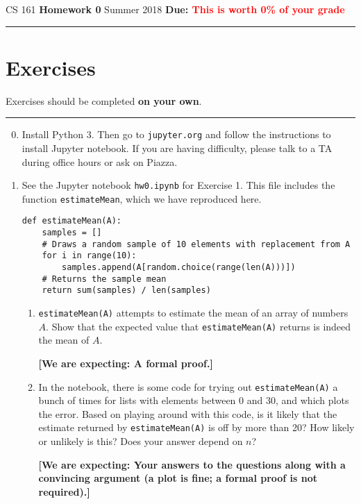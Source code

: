 \documentclass{article}
\begin{document}
\noindent
CS 161 \hfill \textbf{Homework 0} \newline 
Summer 2018 \hfill \textbf{Due: \textcolor{red}{This is worth 0\% of your grade}}

\noindent
\rule{\linewidth}{0.4pt}

\section*{Exercises}

Exercises should be completed \textbf{on your own}.

\noindent\rule{\linewidth}{1.0pt}

\begin{enumerate}
  \setcounter{enumi}{-1}
  \item Install Python 3. Then go to \texttt{jupyter.org} and follow the
    instructions to install Jupyter notebook. If you are having difficulty,
    please talk to a TA during office hours or ask on Piazza.
  \item See the Jupyter notebook \texttt{hw0.ipynb} for Exercise 1. This file
    includes the function \texttt{estimateMean}, which we have reproduced here.

\begin{verbatim}
def estimateMean(A):
    samples = []
    # Draws a random sample of 10 elements with replacement from A
    for i in range(10):
        samples.append(A[random.choice(range(len(A)))])
    # Returns the sample mean
    return sum(samples) / len(samples)
\end{verbatim}

    \begin{enumerate}
      \item \texttt{estimateMean(A)} attempts to estimate the mean of an array of numbers $A$. Show
        that the expected value that \texttt{estimateMean(A)} returns is indeed
        the mean of $A$.

        \textbf{[We are expecting: A formal proof.]}
      \item In the notebook, there is some code for trying out 
        \texttt{estimateMean(A)} a bunch of times for lists with elements
        between 0 and 30, and which plots the error. Based on playing around
        with this code, is it likely that the estimate returned by 
        \texttt{estimateMean(A)} is off by more than 20? How likely or unlikely
        is this? Does your answer depend on $n$?

        \textbf{[We are expecting: Your answers to the questions along with a
        convincing argument (a plot is fine; a formal proof is not required).]}
    \end{enumerate}

\end{enumerate}
\end{document}

